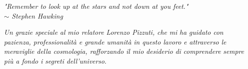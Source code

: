 \clearpage
\thispagestyle{empty}  %
\vspace*{5cm}

\begin{flushright}
\textit{"Remember to look up at the stars and not down at you feet."\\ $\sim$ Stephen Hawking}
\end{flushright}
\vspace{1cm}
\begin{flushleft}
    \textit{Un grazie speciale al mio relatore Lorenzo Pizzuti, che mi ha guidato con pazienza, professionalità e grande umanità in questo lavoro e attraverso le meraviglie della cosmologia, rafforzando il mio desiderio di comprendere sempre più a fondo i segreti dell’universo.}
\end{flushleft}

\vspace{2cm}
